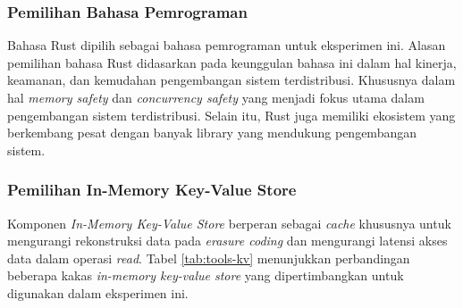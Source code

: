 \subsubsection{Pemilihan Bahasa Pemrograman}
\label{subsubsection:pilihan-bahasa-pemrograman}

Bahasa Rust dipilih sebagai bahasa pemrograman untuk eksperimen ini. Alasan pemilihan bahasa Rust didasarkan pada keunggulan bahasa ini dalam hal kinerja, keamanan, dan kemudahan pengembangan sistem terdistribusi. Khususnya dalam hal \textit{memory safety} dan \textit{concurrency safety} yang menjadi fokus utama dalam pengembangan sistem terdistribusi. Selain itu, Rust juga memiliki ekosistem yang berkembang pesat dengan banyak library yang mendukung pengembangan sistem.

\subsubsection{Pemilihan In-Memory Key-Value Store}
\label{subsubsection:in-memory-kv-store}

Komponen \textit{In-Memory Key-Value Store} berperan sebagai \textit{cache} khususnya untuk mengurangi rekonstruksi data pada \textit{erasure coding} dan mengurangi latensi akses data dalam operasi \textit{read}. Tabel \ref{tab:tools-kv} menunjukkan perbandingan beberapa kakas \textit{in-memory key-value store} yang dipertimbangkan untuk digunakan dalam eksperimen ini.

